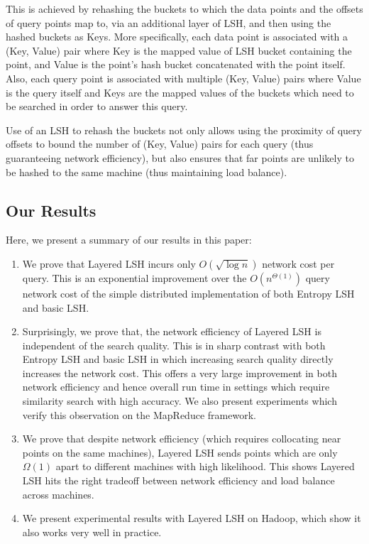 \documentclass{acm_proc_article-sp}
\numberwithin{equation}{section}
\numberwithin{figure}{section}
\begin{document}
This is achieved by rehashing the buckets to which the data points and the offsets of query points map to, via an additional layer of LSH, and then using the hashed buckets as Keys. More specifically, each data point is associated with a (Key, Value) pair where Key is the mapped value of LSH bucket containing the point, and Value is the point's hash bucket concatenated with the point itself. Also, each query point is associated with multiple (Key, Value) pairs where Value is the query itself and Keys are the mapped values of the buckets which need to be searched in order to answer this query. 

Use of an LSH to rehash the buckets not only allows using the proximity of query offsets to bound the number of (Key, Value) pairs for each query (thus guaranteeing network efficiency), but also ensures that far points are unlikely to be hashed to the same machine (thus maintaining load balance).

\subsection{Our Results}
\label{sec:results}

Here, we present a summary of our results in this paper:

\begin{enumerate}
\item We prove that Layered LSH incurs only $O(\sqrt{\log n})$ network cost per query. This is an exponential improvement over the $O(n^{\Theta(1)})$ query network cost of the simple distributed implementation of both Entropy LSH and basic LSH.  
\item Surprisingly, we prove that, the network efficiency of Layered LSH is independent of the search quality. This is in sharp contrast with both Entropy LSH and basic LSH in which increasing search quality directly increases the network cost. This offers a very large improvement in both network efficiency and hence overall run time in settings which require similarity search with high accuracy. We also present experiments which verify this observation on the MapReduce framework.
\item We prove that despite network efficiency (which requires collocating near points on the same machines), Layered LSH sends points which are only $\Omega(1)$ apart to different machines with high likelihood. This shows Layered LSH hits the right tradeoff between network efficiency and load balance across machines.
\item We present experimental results with Layered LSH on Hadoop, which show it also works very well in practice.

\end{enumerate}
\end{document}
